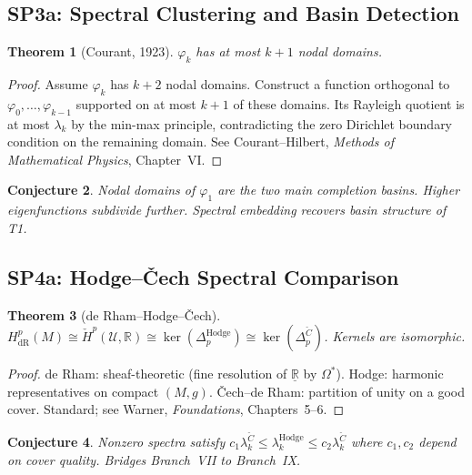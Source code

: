 \documentclass[11pt]{article}
\newtheorem{theorem}{Theorem}[section]
\newtheorem{conjecture}[theorem]{Conjecture}
\theoremstyle{definition}
\theoremstyle{remark}
\begin{document}
\subsection{SP3a: Spectral Clustering and Basin Detection}

\begin{theorem}[Courant, 1923]\label{thm:courant}
$\varphi_k$ has at most $k+1$ nodal domains.
\end{theorem}

\begin{proof}
Assume $\varphi_k$ has $k+2$ nodal domains. Construct a function orthogonal to $\varphi_0, \ldots, \varphi_{k-1}$ supported on at most $k+1$ of these domains. Its Rayleigh quotient is at most $\lambda_k$ by the min-max principle, contradicting the zero Dirichlet boundary condition on the remaining domain. See Courant--Hilbert, \emph{Methods of Mathematical Physics}, Chapter~VI.
\end{proof}

\begin{conjecture}\label{conj:nodal}
Nodal domains of $\varphi_1$ are the two main completion basins. Higher eigenfunctions subdivide further. Spectral embedding recovers basin structure of T1.
\end{conjecture}

\subsection{SP4a: Hodge--\v{C}ech Spectral Comparison}

\begin{theorem}[de Rham--Hodge--\v{C}ech]\label{thm:deRham}
$H^p_{\mathrm{dR}}(M) \cong \check{H}^p(\mathcal{U}, \mathbb{R}) \cong \ker(\Delta_p^{\mathrm{Hodge}}) \cong \ker(\Delta_p^{\check{C}})$. Kernels are isomorphic.
\end{theorem}

\begin{proof}
de Rham: sheaf-theoretic (fine resolution of $\underline{\mathbb{R}}$ by $\Omega^*$). Hodge: harmonic representatives on compact $(M,g)$. \v{C}ech--de Rham: partition of unity on a good cover. Standard; see Warner, \emph{Foundations}, Chapters~5--6.
\end{proof}

\begin{conjecture}\label{conj:cech}
Nonzero spectra satisfy $c_1 \lambda_k^{\check{C}} \le \lambda_k^{\mathrm{Hodge}} \le c_2 \lambda_k^{\check{C}}$ where $c_1, c_2$ depend on cover quality. Bridges Branch~VII to Branch~IX.
\end{conjecture}
\end{document}

